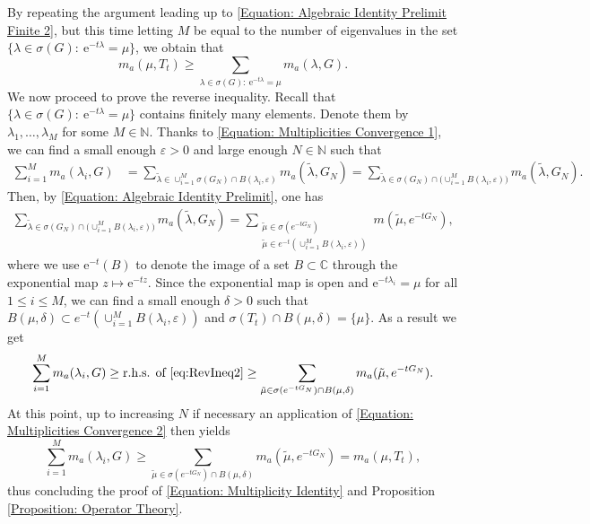\documentclass{amsart}
\numberwithin{equation}{section}
\theoremstyle{definition}
\newcommand\de{\delta}
\newcommand\eps{\varepsilon}
\newcommand\la{\lambda}
\newcommand\si{\sigma}
\newcommand\mbb{\mathbb}
\newcommand\mr{\mathrm}
\begin{document}
By repeating the argument leading up to \eqref{Equation: Algebraic Identity Prelimit Finite 2},
but this time letting $M$ be equal to the number of eigenvalues in the set
$\{\la\in\si(G):~\mr e^{-t\la}=\mu\}$, we obtain that
\[m_a(\mu,T_t)\geq\sum_{\la\in\si(G):~\mr e^{-t\la}=\mu}m_a(\la,G).\]
We now proceed to prove the reverse inequality. Recall that $\{\la\in\si(G):~\mr e^{-t\la}=\mu\}$ contains finitely many elements. Denote them by $\lambda_1, \ldots , \lambda_M$ for some $M\in \mathbb{N}$.
Thanks to \eqref{Equation: Multiplicities Convergence 1}, we can find
a small enough $\eps>0$ and large enough $N\in\mbb N$ such that
\begin{align*}
 \sum_{i=1}^{M} m_{a}(\lambda_i, G) &=\sum_{\tilde{\lambda} \in \cup^{M}_{i=1}\sigma(G_N)\cap B(\lambda_i, \eps)}m_{a}(\tilde{\lambda}, G_N) = \sum_{\tilde{\lambda} \in \sigma(G_N)\cap \big(\cup^{M}_{i=1} B(\lambda_i, \eps)\big)}m_{a}(\tilde{\lambda}, G_N).
\end{align*}
Then, by \eqref{Equation: Algebraic Identity Prelimit}, one has
\begin{align}
\sum_{\tilde{\lambda} \in \sigma(G_N)\cap \big(\cup^{M}_{i=1} B(\lambda_i, \eps)\big)}m_{a}(\tilde{\lambda}, G_N) = \sum_{\substack{\tilde{\mu}\in \sigma(e^{-tG_N})\\\tilde{\mu}\in e^{-t}(\cup_{i=1}^{M}B(\lambda_i,\eps))}}m(\tilde{\mu}, e^{-tG_N}),\label{eq:RevIneq2}
\end{align}
where we use $\mr e^{-t}(B)$ to denote the image of a set $B\subset\mbb C$ through the exponential map $z\mapsto\mr e^{-tz}$.
Since the exponential map is open and $\mr e^{-t\la_i}=\mu$ for all $1\leq i\leq M$, we can find a small enough $\de>0$
such that $B(\mu,\delta)\subset e^{-t}(\cup_{i=1}^{M}B(\lambda_i,\eps))$ and $\si(T_t)\cap B(\mu,\de)=\{\mu\}$.
As a result we get 
\begin{align}
 \sum_{i=1}^{M} m_{a}(\lambda_i, G)\geq\text{r.h.s. of \eqref{eq:RevIneq2}}\geq \sum_{\tilde{\mu}\in \sigma(e^{-tG_N})\cap B(\mu,\delta)} m_a(\tilde{\mu}, e^{-tG_N}).
\end{align}
At this point, up to increasing $N$ if necessary an application of
\eqref{Equation: Multiplicities Convergence 2} then yields
\[ \sum_{i=1}^{M} m_{a}(\lambda_i, G)\geq\sum_{\tilde{\mu}\in \sigma(e^{-tG_N})\cap B(\mu,\delta)} m_a(\tilde{\mu}, e^{-tG_N})
=m_a(\mu,T_t),\]
thus concluding the proof of \eqref{Equation: Multiplicity Identity}
and Proposition \ref{Proposition: Operator Theory}.


%
\end{document}
